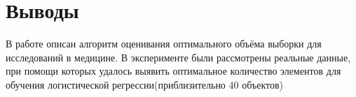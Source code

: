 \documentclass[12pt,twoside]{article}
\begin{document}
\section{Выводы}
В работе описан алгоритм оценивания оптимального объёма выборки для исследований в медицине. В эксперименте были рассмотрены реальные данные, при помощи которых удалось выявить оптимальное количество элементов для обучения логистической регрессии(приблизительно 40 объектов)



\end{document}
